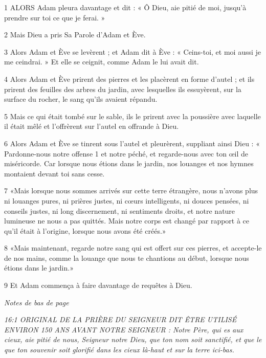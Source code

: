 \par 1 ALORS Adam pleura davantage et dit : « Ô Dieu, aie pitié de moi, jusqu'à prendre sur toi ce que je ferai. »

\par 2 Mais Dieu a pris Sa Parole d'Adam et Ève.

\par 3 Alors Adam et Ève se levèrent ; et Adam dit à Ève : « Ceins-toi, et moi aussi je me ceindrai. » Et elle se ceignit, comme Adam le lui avait dit.

\par 4 Alors Adam et Ève prirent des pierres et les placèrent en forme d'autel ; et ils prirent des feuilles des arbres du jardin, avec lesquelles ils essuyèrent, sur la surface du rocher, le sang qu'ils avaient répandu.

\par 5 Mais ce qui était tombé sur le sable, ils le prirent avec la poussière avec laquelle il était mêlé et l'offrèrent sur l'autel en offrande à Dieu.

\par 6 Alors Adam et Ève se tinrent sous l'autel et pleurèrent, suppliant ainsi Dieu : « Pardonne-nous notre offense 1 et notre péché, et regarde-nous avec ton œil de miséricorde. Car lorsque nous étions dans le jardin, nos louanges et nos hymnes montaient devant toi sans cesse.

\par 7 «Mais lorsque nous sommes arrivés sur cette terre étrangère, nous n'avons plus ni louanges pures, ni prières justes, ni cœurs intelligents, ni douces pensées, ni conseils justes, ni long discernement, ni sentiments droits, et notre nature lumineuse ne nous a pas quittés. Mais notre corps est changé par rapport à ce qu'il était à l'origine, lorsque nous avons été créés.»

\par 8 «Mais maintenant, regarde notre sang qui est offert sur ces pierres, et accepte-le de nos mains, comme la louange que nous te chantions au début, lorsque nous étions dans le jardin.»

\par 9 Et Adam commença à faire davantage de requêtes à Dieu.

\par \textit{Notes de bas de page}

\par \textit{16:1 ORIGINAL DE LA PRIÈRE DU SEIGNEUR DIT ÊTRE UTILISÉ ENVIRON 150 ANS AVANT NOTRE SEIGNEUR : Notre Père, qui es aux cieux, aie pitié de nous, Seigneur notre Dieu, que ton nom soit sanctifié, et que le que ton souvenir soit glorifié dans les cieux là-haut et sur la terre ici-bas.}


